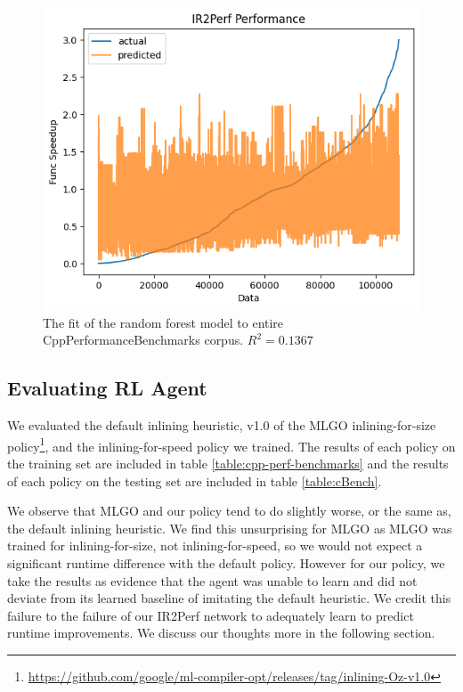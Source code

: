 \documentclass[nohyperref]{article}
\theoremstyle{plain}
\theoremstyle{definition}
\theoremstyle{remark}
\begin{document}
\begin{figure}[h!]
    \centerline{\includegraphics[width=\columnwidth]{ir2perf-fit}}
    \caption{The fit of the random forest model to entire CppPerformanceBenchmarks corpus. $R^2 = 0.1367$}
    \label{fig:ir2perf-fit}
\end{figure}

\subsection{Evaluating RL Agent}
We evaluated the default inlining heuristic, v1.0 of the MLGO inlining-for-size policy\footnote{\href{https://github.com/google/ml-compiler-opt/releases/tag/inlining-Oz-v1.0}{https://github.com/google/ml-compiler-opt/releases/tag/inlining-Oz-v1.0}}, and the inlining-for-speed policy we trained. The results of each policy on the training set are included in table \ref{table:cpp-perf-benchmarks} and the results of each policy on the testing set are included in table \ref{table:cBench}.

We observe that MLGO and our policy tend to do slightly worse, or the same as, the default inlining heuristic. We find this unsurprising for MLGO as MLGO was trained for inlining-for-size, not inlining-for-speed, so we would not expect a significant runtime difference with the default policy. However for our policy, we take the results as evidence that the agent was unable to learn and did not deviate from its learned baseline of imitating the default heuristic. We credit this failure to the failure of our IR2Perf network to adequately learn to predict runtime improvements. We discuss our thoughts more in the following section.
\end{document}
